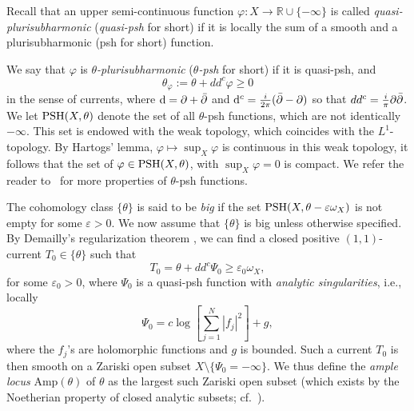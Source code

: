 \documentclass[a4paper,11pt]{amsart}
\numberwithin{equation}{section}
\theoremstyle{definition}
\newcommand{\ddc}{dd^c}
\newcommand{\PSH}{{\rm PSH}}
\begin{document}
Recall that an upper semi-continuous function $ \varphi:X \rightarrow\mathbb{R}\cup\{-\infty\} $
is called {\it quasi-plurisubharmonic} ({\it quasi-psh} for short) if it is locally the sum of a smooth and a plurisubharmonic (psh for short) function. 

We say that $\varphi$ is {\it $\theta$-plurisubharmonic}  ({\it $\theta$-psh} for short) if it is quasi-psh, and $$\theta_\varphi:=\theta+\ddc \varphi\geq 0$$ in the sense of currents, where ${\rm d}=
\partial+\Bar{\partial}$ and ${\rm d}^c=\frac{i}{2\pi}(\Bar{\partial}-\partial)$ so that $\ddc=\frac{i}{\pi}\partial\Bar{\partial}$. 
We let $\PSH(X,\theta)$ denote the set of all $\theta$-psh functions, which are not identically $-\infty$. This set is endowed with 
the weak topology, which coincides  with 
 the $L^1$-topology. By Hartogs' lemma, $\varphi\mapsto\sup_X\varphi$ is continuous in this weak topology, 
it follows that the set of $\varphi\in\PSH(X,\theta)$, with $\sup_X\varphi=0$ is compact. 
We refer the reader to~\cite{demaillycomplex,guedj2017degenerate} for more properties of $\theta$-psh functions.   


The cohomology class $\{\theta\}$ is said to be {\em big} if the set $\PSH(X,\theta-\varepsilon\omega_X)$ is not empty for some $\varepsilon>0$.	
	We now assume that $\{\theta\}$ is big unless otherwise specified.
By Demailly's regularization theorem \cite{demailly1992regularization}, we can find a closed positive $(1,1)$-current $T_0\in \{\theta\}$ such that $$T_0=\theta+\ddc\Psi_0\geq \varepsilon_0\omega_X,$$ for some $\varepsilon_0>0$, where $\Psi_0$ is a quasi-psh function with \emph{analytic singularities}, i.e., locally %
	$$	\Psi_0=c\log\left[\sum_{j=1}^{N}|f_j|^2\right]+g,
	$$
	where the $f_j$'s are holomorphic functions and $g$ is bounded. Such a current $T_0$ is then smooth on a Zariski open subset $X\setminus\{\Psi_0=-\infty\}$. We thus define the {\em ample locus} $\textrm{Amp}(\theta)$ of $\theta$ as the largest such Zariski open subset (which exists by the Noetherian property of closed analytic subsets; cf.~\cite{boucksom2004divisorial}).
\end{document}
